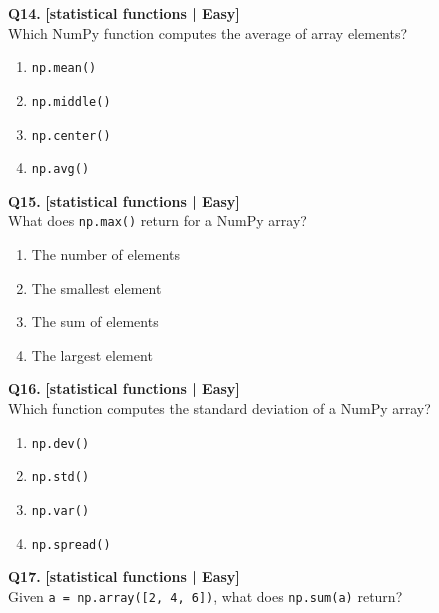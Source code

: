 \noindent\textbf{Q14.} \hfill {\small\color{LPUOrange}\textbf{[statistical functions | Easy]}}\\[2pt]
Which NumPy function computes the average of array elements?

\begin{enumerate}[label=(\alph*),topsep=2pt,itemsep=1pt,partopsep=0pt,parsep=0pt]
    \item \relax \texttt{np.mean()}
    \item \relax \texttt{np.middle()}
    \item \relax \texttt{np.center()}
    \item \relax \texttt{np.avg()}
\end{enumerate}
\vspace{2mm}

\noindent\textbf{Q15.} \hfill {\small\color{LPUOrange}\textbf{[statistical functions | Easy]}}\\[2pt]
What does \texttt{np.max()} return for a NumPy array?

\begin{enumerate}[label=(\alph*),topsep=2pt,itemsep=1pt,partopsep=0pt,parsep=0pt]
    \item \relax The number of elements
    \item \relax The smallest element
    \item \relax The sum of elements
    \item \relax The largest element
\end{enumerate}
\vspace{2mm}

\noindent\textbf{Q16.} \hfill {\small\color{LPUOrange}\textbf{[statistical functions | Easy]}}\\[2pt]
Which function computes the standard deviation of a NumPy array?

\begin{enumerate}[label=(\alph*),topsep=2pt,itemsep=1pt,partopsep=0pt,parsep=0pt]
    \item \relax \texttt{np.dev()}
    \item \relax \texttt{np.std()}
    \item \relax \texttt{np.var()}
    \item \relax \texttt{np.spread()}
\end{enumerate}
\vspace{2mm}

\noindent\textbf{Q17.} \hfill {\small\color{LPUOrange}\textbf{[statistical functions | Easy]}}\\[2pt]
Given \texttt{a = np.array([2, 4, 6])}, what does \texttt{np.sum(a)} return?


